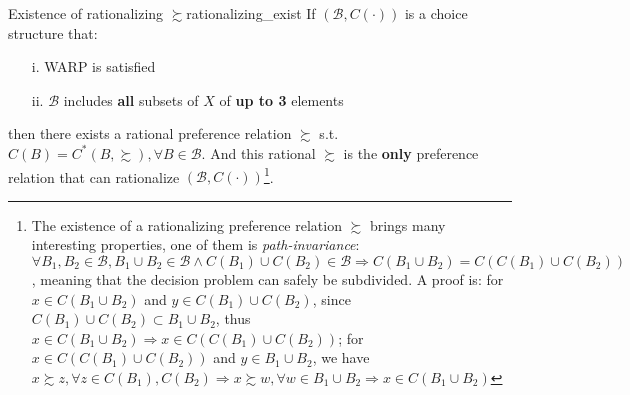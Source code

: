 \begin{theorem}{Existence of rationalizing $\succsim$}{rationalizing_exist}
    If $(\mathcal{B},C(\cdot))$ is a choice structure that:
    \begin{enumerate}
        \item[i.] WARP is satisfied
        \item[ii.] $\mathcal{B}$ includes \textbf{all} subsets of $X$ of \textbf{up to 3} elements 
    \end{enumerate}
    then there exists a rational preference relation $\succsim$ s.t. $C(B)=C^*(B,\succsim),\forall B\in\mathcal{B}$. And this rational $\succsim$ is the \textbf{only} preference relation that can rationalize
     $(\mathcal{B},C(\cdot))$\footnote{The existence of a rationalizing preference relation $\succsim$ brings many interesting properties, one of them is \textit{path-invariance}: $\forall B_1,B_2\in\mathcal{B}, B_1\cup B_2 \in\mathcal{B}\land C(B_1)\cup C(B_2)\in\mathcal{B}\Rightarrow C(B_1\cup B_2)=C(C(B_1)\cup C(B_2))$, meaning that the decision problem can safely be subdivided. 
     A proof is: for $x\in C(B_1\cup B_2)$ and $y\in C(B_1)\cup C(B_2)$, since $C(B_1)\cup C(B_2) \subset B_1\cup B_2$, thus $x\in C(B_1\cup B_2)\Rightarrow x\in C(C(B_1)\cup C(B_2))$; for $x\in C(C(B_1)\cup C(B_2))$ and $y\in B_1\cup B_2$, we have $x\succsim z,\forall z\in C(B_1),C(B_2)\Rightarrow x\succsim w,\forall w\in B_1\cup B_2\Rightarrow x\in C(B_1\cup B_2)$}.
\end{theorem}

